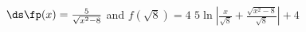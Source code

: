 {$\ds \fp(x) =\frac5{\sqrt{x^2-8}}$ and $f\left(\sqrt{8}\right)=4$
}
{$5\ln\left|\frac{x}{\sqrt{8}}+\frac{\sqrt{x^2-8}}{\sqrt{8}}\right| + 4$
}

